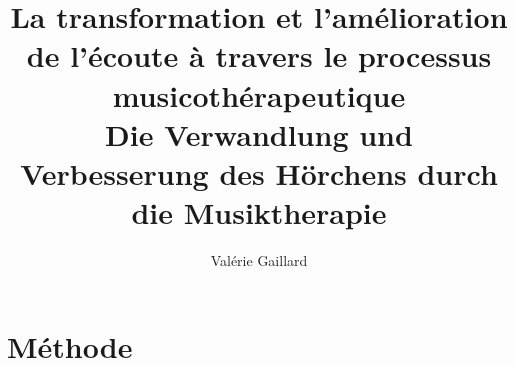 \documentclass[12pt,pagesize, DIV=14, oneside, headsepline,
titlepage,parskip, headings=small, listof=totoc, 
bibliography=totoc,index=totoc, captions=tableheading, final]{scrreprt}
\title{La transformation et l'amélioration de l'écoute à travers le
  processus musicothérapeutique\\
Die Verwandlung und Verbesserung des Hörchens durch die Musiktherapie}
\author{Valérie Gaillard}
\begin{document}
\part{Méthode}

\tableofcontents


 






\appendix

%
\nocite{*} %
\label{bibliographie}
\printbibliography
\end{document}

